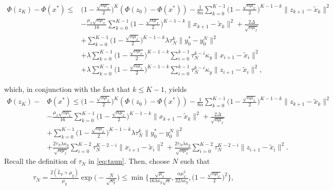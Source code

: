 \documentclass{osudissert96}
\begin{document}
\begin{small}
\begin{align}
\Phi(z_{K})-\Phi(x^*) \leq & \big(1-\frac{\sqrt{\alpha\mu_x}}{2}\big)^K(\Phi(z_{0})-\Phi(x^*)) - \frac{1}{8\alpha}\sum_{k=0}^{K-1} \big(1-\frac{\sqrt{\alpha\mu_x}}{2}\big)^{K-1-k}\|z_{k+1}-\widetilde x_k\|^2 \nonumber
\\&- \frac{\mu_x\sqrt{\alpha\mu_x}}{16}\sum_{k=0}^{K-1} \big(1-\frac{\sqrt{\alpha\mu_x}}{2}\big)^{K-1-k}\|x_{k+1}-\widetilde x_k\|^2 + \frac{2\Delta}{\sqrt{\alpha\mu_x}} \nonumber
\\&+\sum_{k=0}^{K-1} \big(1-\frac{\sqrt{\alpha\mu_x}}{2}\big)^{K-1-k}\lambda \tau_N^k \|y_0^*-y_0^N\|^2 \nonumber
\\&+ \lambda\sum_{k=0}^{K-1} \big(1-\frac{\sqrt{\alpha\mu_x}}{2}\big)^{K-1-k}\sum_{i=0}^{k-1}\tau_N^{k-i}\kappa_y\|x_{i+1}-\widetilde x_{i}\|^2  \nonumber
\\&+\lambda\sum_{k=0}^{K-1} \big(1-\frac{\sqrt{\alpha\mu_x}}{2}\big)^{K-1-k}\sum_{i=0}^{k-1}\tau_N^{k-i}\kappa_y\|z_{i+1}-\widetilde x_{i}\|^2, \nonumber
\end{align}
\end{small}
\hspace{-0.12cm}which, in conjunction with the fact that $k\leq K-1$, yields
{\small
\begin{align}\label{eq:zkcgsaca}
\Phi(z_{K})-&\Phi(x^*) \leq  \big(1-\frac{\sqrt{\alpha\mu_x}}{2}\big)^K(\Phi(z_{0})-\Phi(x^*)) - \frac{1}{8\alpha}\sum_{k=0}^{K-1} \big(1-\frac{\sqrt{\alpha\mu_x}}{2}\big)^{K-1-k}\|z_{k+1}-\widetilde x_k\|^2 \nonumber
\\&- \frac{\mu_x\sqrt{\alpha\mu_x}}{16}\sum_{k=0}^{K-1} \big(1-\frac{\sqrt{\alpha\mu_x}}{2}\big)^{K-1-k}\|x_{k+1}-\widetilde x_k\|^2 + \frac{2\Delta}{\sqrt{\alpha\mu_x}} \nonumber
\\&+\sum_{k=0}^{K-1} \big(1-\frac{\sqrt{\alpha\mu_x}}{2}\big)^{K-1-k}\lambda \tau_N^k \|y_0^*-y_0^N\|^2 \nonumber
\\&+ \frac{2\tau_N\lambda\kappa_y}{\sqrt{\alpha\mu_x}}\sum_{i=0}^{K-2}\tau_N^{K-2-i}\|x_{i+1}-\widetilde x_{i}\|^2  + \frac{2\tau_N\lambda\kappa_y}{\sqrt{\alpha\mu_x}}\sum_{i=0}^{K-2}\tau_N^{K-2-i}\|z_{i+1}-\widetilde x_{i}\|^2.
\end{align}}
\hspace{-0.13cm}Recall the definition of $\tau_N$ in \cref{eq:taun}. Then, choose $N$ such that 
\begin{align}\label{eq:nrequire}
\tau_N=\frac{2(\widetilde L_y +\mu_y)}{\mu_y} \exp\Big(-\frac{N}{\sqrt{\kappa_y}}\Big) \leq \min\Big\{ \frac{\sqrt{\mu_x}}{16\lambda\kappa_y\sqrt{\alpha}}, \frac{\alpha\mu_x^2}{32\lambda\kappa_y},\big(1-\frac{\sqrt{\alpha\mu_x}}{2}\big)^2\Big\}, 
\end{align}
\end{document}
